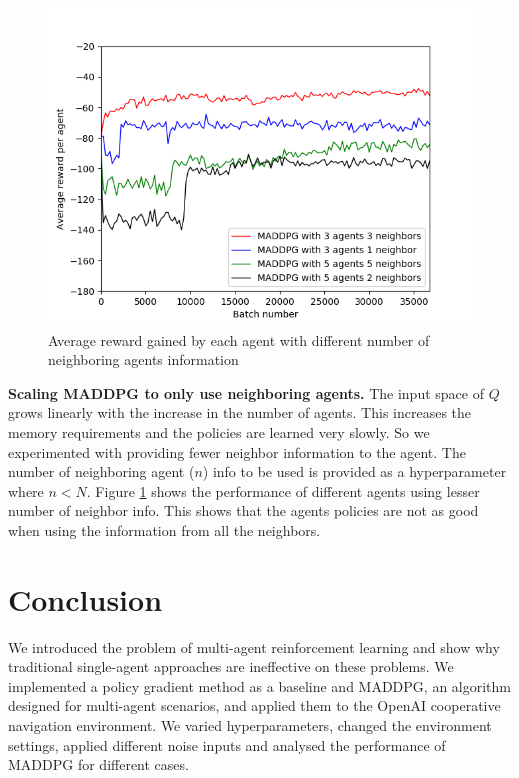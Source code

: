 \documentclass{article}
\begin{document}
\begin{figure}
\begin{center}
\includegraphics[scale=0.5]{MADDPG_different_neighbors.png}
\end{center}
\caption{Average reward gained by each agent with different number of neighboring agents information}
\label{fig:avg_reward_different_neighbors}
\end{figure}

\textbf{Scaling MADDPG to only use neighboring agents.} The input space of $Q$ grows linearly with the increase in the number of agents. This increases the memory requirements and the policies are learned very slowly. So we experimented with providing fewer neighbor information to the agent. The number of neighboring agent ($n$) info to be used is provided as a hyperparameter where $n < N$. Figure \ref{fig:avg_reward_different_neighbors} shows the performance of different agents using lesser number of neighbor info. This shows that the agents policies are not as good when using the information from all the neighbors.  

\section{Conclusion}

We introduced the problem of multi-agent reinforcement learning and show why traditional single-agent approaches are ineffective on these problems. We implemented a policy gradient method as a baseline and MADDPG, an algorithm designed for multi-agent scenarios, and applied them to the OpenAI cooperative navigation environment. We varied hyperparameters, changed the environment settings, applied different noise inputs and analysed the performance of MADDPG for different cases. 
\end{document}
